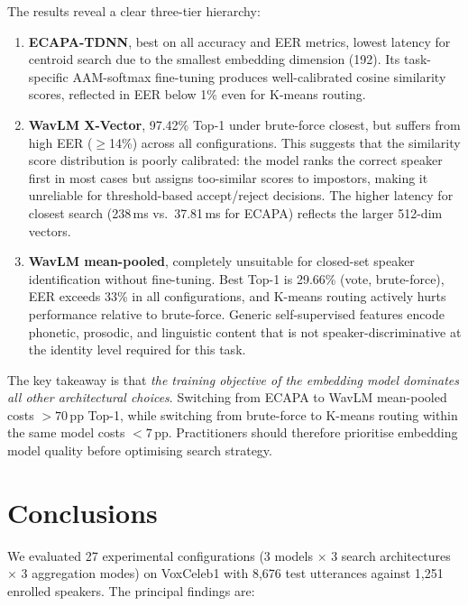 \documentclass[12pt, a4paper]{article}
\begin{document}
The results reveal a clear three-tier hierarchy:

\begin{enumerate}
  \item \textbf{ECAPA-TDNN}, best on all accuracy and EER metrics,
        lowest latency for centroid search due to the smallest
        embedding dimension (192).
        Its task-specific AAM-softmax fine-tuning produces
        well-calibrated cosine similarity scores, reflected in EER
        below 1\% even for K-means routing.
  \item \textbf{WavLM X-Vector}, 97.42\% Top-1 under brute-force
        closest, but suffers from high EER ($\geq$14\%) across all
        configurations.
        This suggests that the similarity score distribution is
        poorly calibrated: the model ranks the correct speaker first
        in most cases but assigns too-similar scores to impostors,
        making it unreliable for threshold-based accept/reject decisions.
        The higher latency for closest search (238\,ms vs.\ 37.81\,ms
        for ECAPA) reflects the larger 512-dim vectors.
  \item \textbf{WavLM mean-pooled}, completely unsuitable for
        closed-set speaker identification without fine-tuning.
        Best Top-1 is 29.66\% (vote, brute-force), EER exceeds 33\%
        in all configurations, and K-means routing actively hurts
        performance relative to brute-force.
        Generic self-supervised features encode phonetic, prosodic,
        and linguistic content that is not speaker-discriminative at
        the identity level required for this task.
\end{enumerate}

The key takeaway is that \emph{the training objective of the embedding
model dominates all other architectural choices}.
Switching from ECAPA to WavLM mean-pooled costs $>70$\,pp Top-1,
while switching from brute-force to K-means routing within the same
model costs $<7$\,pp.
Practitioners should therefore prioritise embedding model quality
before optimising search strategy.

\section{Conclusions}
\label{sec:conclusion}

We evaluated 27 experimental configurations (3 models $\times$
3 search architectures $\times$ 3 aggregation modes) on VoxCeleb1
with 8,676 test utterances against 1,251 enrolled speakers.
The principal findings are:
\end{document}
